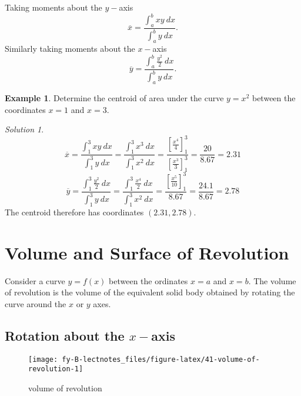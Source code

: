 \documentclass[
  11pt,
  oneside]{book}
\newcommand{\slide}{}
\theoremstyle{definition}
\theoremstyle{definition}
\newtheorem{example}{Example}[chapter]
\theoremstyle{definition}
\theoremstyle{definition}
\theoremstyle{remark}
\newtheorem*{solution}{Solution}
\begin{document}
Taking moments about the \(y-\)axis
\[
\overline x = \frac{\displaystyle\int_a^bxy\ dx}{\displaystyle\int_a^b y\ dx}.
\]
Similarly taking moments about the \(x-\)axis
\[
\overline y = \frac{\displaystyle\int_a^b \frac{y^2}2\ dx}{\displaystyle\int_a^b y\ dx}.
\]
\slide

\begin{example}
Determine the centroid of area under the curve \(y=x^2\) between the coordinates \(x=1\) and \(x=3\).
\end{example}

\begin{solution}
\[
\overline x = \frac{\displaystyle\int_1^3xy\ dx}{\displaystyle\int_1^3 y\ dx} = \frac{\displaystyle\int_1^3x^3\ dx}{\displaystyle\int_1^3x^2\ dx} = \frac{\left[\frac{x^4}{4}\right]_1^3}{\left[\frac{x^3}{3}\right]_1^3} = \frac{20}{8.67} = 2.31
\]
\[
\overline y = \frac{\displaystyle\int_1^3\frac{y^2}2\ dx}{\displaystyle\int_1^3 y\ dx} = \frac{\displaystyle\int_1^3\frac{x^4}2\ dx}{\displaystyle\int_1^3x^2\ dx} = \frac{\left[\frac{x^5}{10}\right]_1^3}{8.67} = \frac{24.1}{8.67} = 2.78
\]
The centroid therefore has coordinates \((2.31,2.78)\).
\end{solution}

\slide

\section{Volume and Surface of Revolution}\label{volume-and-surface-of-revolution}

Consider a curve \(y = f(x)\) between the ordinates \(x = a\) and \(x = b\). The volume of revolution is the volume of the equivalent solid body obtained by rotating the curve around the \(x\) or \(y\) axes.

\slide

\subsection{\texorpdfstring{Rotation about the \(x-\)axis}{Rotation about the x-axis}}\label{rotation-about-the-x-axis}

\begin{figure}

{\centering \texttt{[image: fy-B-lectnotes\_files/figure-latex/41-volume-of-revolution-1]} 

}

\caption{volume of revolution}\label{fig:41-volume-of-revolution}
\end{figure}
\end{document}
